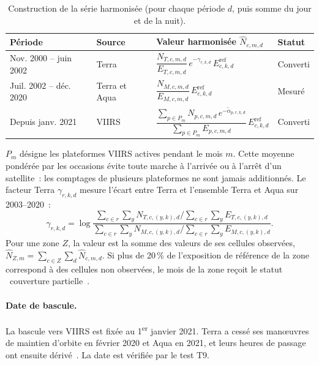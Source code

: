 \documentclass[11pt,a4paper]{article}
\newcommand{\og}{\guillemotleft~}
\newcommand{\fg}{~\guillemotright}
\begin{document}
\begin{table}[h]
\centering\small
\caption{Construction de la série harmonisée (pour chaque période $d$, puis somme du jour et de la nuit).}
\label{tab:serie}
\renewcommand{\arraystretch}{1.6}
\begin{tabularx}{\linewidth}{>{\raggedright\arraybackslash}p{3.2cm} >{\raggedright\arraybackslash}p{2.2cm} Y l}
\toprule
Période & Source & Valeur harmonisée $\hat N_{c,m,d}$ & Statut \\
\midrule
Nov. 2000 -- juin 2002 & Terra & $\dfrac{N_{T,c,m,d}}{E_{T,c,m,d}}\,e^{-\gamma_{r,k,d}}\,E^{\text{ref}}_{c,k,d}$ & Converti \\
Juil. 2002 -- déc. 2020 & Terra et Aqua & $\dfrac{N_{M,c,m,d}}{E_{M,c,m,d}}\,E^{\text{ref}}_{c,k,d}$ & Mesuré \\
Depuis janv. 2021 & VIIRS & $\dfrac{\sum_{p\in P_m} N_{p,c,m,d}\, e^{-\tilde\alpha_{p,r,k,d}}}{\sum_{p\in P_m} E_{p,c,m,d}}\,E^{\text{ref}}_{c,k,d}$ & Converti \\
\bottomrule
\end{tabularx}
\end{table}

$P_m$ désigne les plateformes VIIRS actives pendant le mois $m$. Cette moyenne pondérée par les occasions évite toute marche à l'arrivée ou à l'arrêt d'un satellite~: les comptages de plusieurs plateformes ne sont jamais additionnés. Le facteur Terra $\gamma_{r,k,d}$ mesure l'écart entre Terra et l'ensemble Terra et Aqua sur 2003--2020~:
\begin{equation}
  \gamma_{r,k,d} = \log \frac{\sum_{c\in r}\sum_{y} N_{T,c,(y,k),d} \big/ \sum_{c\in r}\sum_{y} E_{T,c,(y,k),d}}{\sum_{c\in r}\sum_{y} N_{M,c,(y,k),d} \big/ \sum_{c\in r}\sum_{y} E_{M,c,(y,k),d}}.
\end{equation}
Pour une zone $Z$, la valeur est la somme des valeurs de ses cellules observées, $\hat N_{Z,m} = \sum_{c\in Z}\sum_d \hat N_{c,m,d}$. Si plus de 20\,\% de l'exposition de référence de la zone correspond à des cellules non observées, le mois de la zone reçoit le statut \og couverture partielle\fg.

\paragraph{Date de bascule.} La bascule vers VIIRS est fixée au 1\textsuperscript{er} janvier 2021. Terra a cessé ses manœuvres de maintien d'orbite en février 2020 et Aqua en 2021, et leurs heures de passage ont ensuite dérivé~\cite{nsidc}. La date est vérifiée par le test T9.
\end{document}
